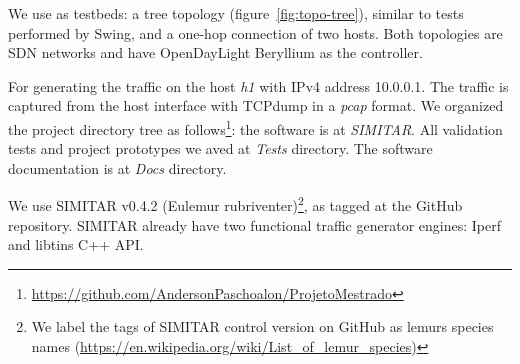 We use as testbeds: a tree topology (figure~\ref{fig:topo-tree}), similar to tests performed by Swing\cite{swing-paper}\cite{background-traffic-matter}\cite{legotg-paper}, and a one-hop connection of two hosts. Both topologies are SDN networks and have OpenDayLight Beryllium as the controller.

For generating the traffic on the host \textit{h1} with IPv4 address 10.0.0.1. The traffic is captured from the host interface with TCPdump in a \textit{pcap} format.  We organized the project directory tree as follows\footnote{ \href{https://github.com/AndersonPaschoalon/ProjetoMestrado}{https://github.com/AndersonPaschoalon/ProjetoMestrado} }: the software is at \textit{SIMITAR}. All validation tests and project prototypes we aved at \textit{Tests} directory. The software documentation is at \textit{Docs} directory.

We use SIMITAR v0.4.2 (Eulemur rubriventer)\footnote{ We label the tags of SIMITAR control version on GitHub as lemurs species names (\href{https://en.wikipedia.org/wiki/List_of_lemur_species}{https://en.wikipedia.org/wiki/List\_of\_lemur\_species})}, as tagged at the GitHub repository.  SIMITAR already have two functional traffic generator engines: Iperf and libtins C++ API.  


